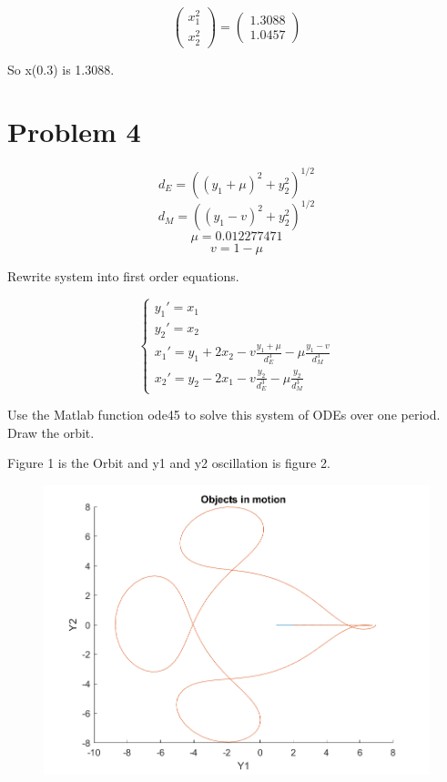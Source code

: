 \documentclass[]{article}
\begin{document}
\[
\left(\begin{array}{c} 
x_1^2\\
x_2^2
\end{array}\right)=
\left(\begin{array}{c} 
1.3088 \\
1.0457
\end{array}\right)
\]

So x(0.3) is 1.3088.

\section{Problem 4}\label{problem-4}

\[d_E = ((y_1 + \mu)^2 + y_2^2)^{1/2}\]
\[d_M = ((y_1 - v)^2 + y_2^2)^{1/2}\] \[\mu = 0.012277471\]
\[v = 1 - \mu\]

Rewrite system into first order equations.

\[
\begin{cases} 
      y_1' =  x_1\\
      y_2' =  x_2\\
      x_1' = y_1 + 2x_2 - v\frac{y_1+\mu}{d_E^3}-\mu\frac{y_1-v}{d_M^3}\\
      x_2' = y_2 - 2x_1-v\frac{y_2}{d_E^3}-\mu\frac{y_2}{d_M^3}
\end{cases}
\]

Use the Matlab function ode45 to solve this system of ODEs over one
period. Draw the orbit.

Figure 1 is the Orbit and y1 and y2 oscillation is figure 2.

\begin{figure}
\centering
\includegraphics{./Orbit.png}
\caption{}
\end{figure}
\end{document}
